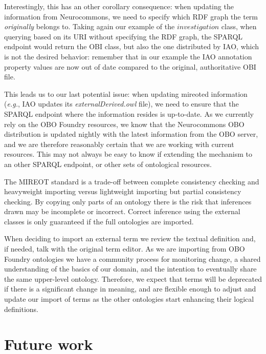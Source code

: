 \documentclass{ao2e}%
\begin{document}
Interestingly, this has an other corollary consequence: when updating the information from Neurocommons, we need to specify which \ac{RDF} graph \cite{RDF} the term \emph{originally} belongs to. Taking again our example of the $investigation$ class, when querying based on its URI without specifying the RDF graph, the SPARQL endpoint would return the \ac{OBI} class, but also the one distributed by \ac{IAO}, which is not the desired behavior: remember that in our example the \ac{IAO} annotation property values are now out of date compared to the original, authoritative \ac{OBI} file.

This leads us to our last potential issue: when updating mireoted information (\emph{e.g.}, \ac{IAO} updates its \emph{externalDerived.owl} file), we need to ensure that the SPARQL endpoint where the information resides is up-to-date. As we currently rely on the \ac{OBO} Foundry resources, we know that the Neurocommons \ac{OBO} distribution is updated nightly with the latest information from the \ac{OBO} server, and we are therefore reasonably certain that we are working with current resources. This may not always be easy to know if extending the mechanism to an other SPARQL endpoint, or other sets of ontological resources.

The \ac{MIREOT} standard is a trade-off between complete consistency checking and heavyweight importing versus lightweight importing but partial consistency checking.
By copying only parts of an ontology there is the risk that inferences drawn may be incomplete or incorrect. 
Correct inference using the external classes is only guaranteed if the full ontologies are imported.

When deciding to import an external term we review the textual definition and, if needed, talk with the original term editor.
As we are importing from \ac{OBO} Foundry ontologies we have a community process for monitoring change, a shared understanding of the basics of our domain, and the intention to eventually share the same upper-level ontology. 
Therefore, we expect that terms will be deprecated if there is a significant change in meaning, and are flexible enough to adjust and update our import of terms as the other ontologies start enhancing their logical definitions.



\section*{Future work}
\end{document}
